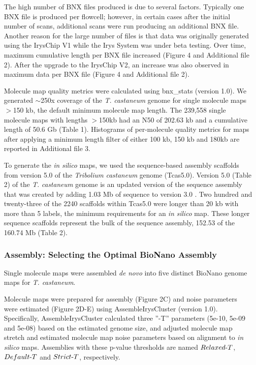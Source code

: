 \documentclass{bmcart}
\begin{document}
The high number of BNX files produced is due to several factors. Typically one BNX file is produced per flowcell; however, in certain cases after the initial number of scans, additional scans were run producing an additional BNX file. Another reason for the large number of files is that data was originally generated using the IrysChip\textregistered\textnormal{ }V1 while the Irys System was under beta testing. Over time, maximum cumulative length per BNX file increased (Figure 4 and Additional file 2). After the upgrade to the IrysChip V2, an increase was also observed in maximum data per BNX file (Figure 4 and Additional file 2).


Molecule map quality metrics were calculated using bnx\_stats (version 1.0). We generated $\sim$250x coverage of the \textit{T. castaneum} genome for single molecule maps $>$150 kb, the default minimum molecule map length. The 239,558 single molecule maps with lengths $>$150kb had an N50 of 202.63 kb and a cumulative length of 50.6 Gb (Table 1). Histograms of per-molecule quality metrics for maps after applying a minimum length filter of either 100 kb, 150 kb and 180kb are reported in Additional file 3. 


To generate the \textit{in silico} maps, we used the sequence-based assembly scaffolds from version 5.0 of the \textit{Tribolium castaneum} genome (Tcas5.0). Version 5.0 (Table 2) of the \textit{T. castaneum} genome is an updated version of the sequence assembly that was created by adding 1.03 Mb of sequence to version 3.0 \cite{Beetle2008}. Two hundred and twenty-three of the 2240 scaffolds within Tcas5.0 were longer than 20 kb with more than 5 labels, the minimum requirements for an \textit{in silico}  map. These longer sequence scaffolds represent the bulk of the sequence assembly, 152.53 of the 160.74 Mb (Table 2).


\subsubsection*{Assembly: Selecting the Optimal BioNano Assembly}
Single molecule maps were assembled \textit{de novo} into five distinct BioNano genome maps for \textit{T. castaneum}. 


Molecule maps were prepared for assembly (Figure 2C) and noise parameters were estimated (Figure 2D-E) using AssembleIrysCluster (version 1.0). Specifically, AssembleIrysCluster calculated three {\textquotedblright}-T{\textquotedblright} parameters (5e-10, 5e-09 and 5e-08) based on the estimated genome size, and adjusted molecule map stretch and estimated molecule map noise parameters based on alignment to \textit{in silico} maps. Assemblies with these p-value thresholds are named $Relaxed\textnormal{-}T$, $Default\textnormal{-}T$ and $Strict\textnormal{-}T$, respectively. 
\end{document}
